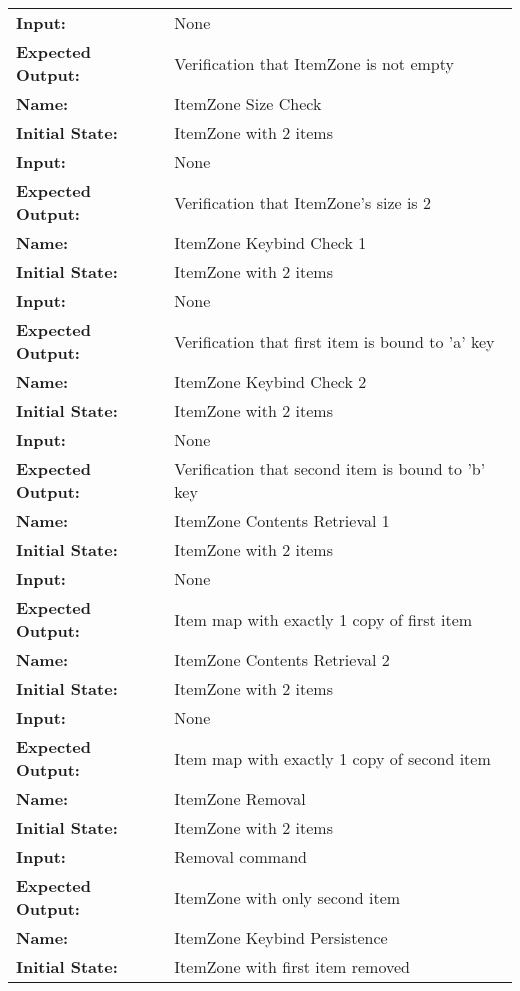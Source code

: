 \documentclass[12pt, titlepage]{article}
\begin{document}
\begin{center}
\begin{longtable}{ l | p{10cm} }
				\textbf{Input:} & None\\
				\textbf{Expected Output:} & Verification that ItemZone is not empty\\
				\hline
				\textbf{Name:} & ItemZone Size Check\\
				\textbf{Initial State:} & ItemZone with 2 items\\
				\textbf{Input:} & None\\
				\textbf{Expected Output:} & Verification that ItemZone's size is 2\\
				\hline
				\textbf{Name:} & ItemZone Keybind Check 1\\
				\textbf{Initial State:} & ItemZone with 2 items\\
				\textbf{Input:} & None\\
				\textbf{Expected Output:} & Verification that first item is bound to 'a' key\\
				\hline
				\textbf{Name:} & ItemZone Keybind Check 2\\
				\textbf{Initial State:} & ItemZone with 2 items\\
				\textbf{Input:} & None\\
				\textbf{Expected Output:} & Verification that second item is bound to 'b' key\\
				\hline
				\textbf{Name:} & ItemZone Contents Retrieval 1\\
				\textbf{Initial State:} & ItemZone with 2 items\\
				\textbf{Input:} & None\\
				\textbf{Expected Output:} & Item map with exactly 1 copy of first item\\
				\hline
				\textbf{Name:} & ItemZone Contents Retrieval 2\\
				\textbf{Initial State:} & ItemZone with 2 items\\
				\textbf{Input:} & None\\
				\textbf{Expected Output:} & Item map with exactly 1 copy of second item\\
				\hline
				\textbf{Name:} & ItemZone Removal\\
				\textbf{Initial State:} & ItemZone with 2 items\\
				\textbf{Input:} & Removal command\\
				\textbf{Expected Output:} & ItemZone with only second item\\
				\hline
				\textbf{Name:} & ItemZone Keybind Persistence\\
				\textbf{Initial State:} & ItemZone with first item removed\\

\end{longtable}
\end{center}
\end{document}
